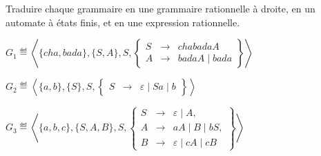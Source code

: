 
\begingroup

\begin{exercice}\label{exo:parsing/rational/rational_to_other}

  Traduire chaque grammaire en une grammaire rationnelle à droite, en un automate à états finis, et en une expression rationnelle.

  \begin{questions}
  \item $G_1 \eqdef \left\langle\{cha, bada\}, \{S, A\}, S, \left\{
    \begin{array}{lll}
      S   &\rightarrow& cha bada A \\
      A   &\rightarrow& bada A \mid bada
    \end{array}\right\}\right\rangle$
  \item $G_2 \eqdef \left\langle\{a, b\}, \{S\}, S, \left\{
    \begin{array}{lll}
      S   &\rightarrow& \varepsilon \;|\; Sa \;|\; b 
    \end{array}\right\}\right\rangle$
  \item $G_3 \eqdef \left\langle\{a, b, c\}, \{S, A, B\}, S, \left\{
    \begin{array}{lll}
      S   &\rightarrow& \varepsilon \;|\; A ,\\
      A   &\rightarrow& aA \;|\; B \;|\; bS ,\\
      B   &\rightarrow& \varepsilon \;|\; cA \;|\; cB
    \end{array}\right\}\right\rangle$
  \end{questions}

\end{exercice}

